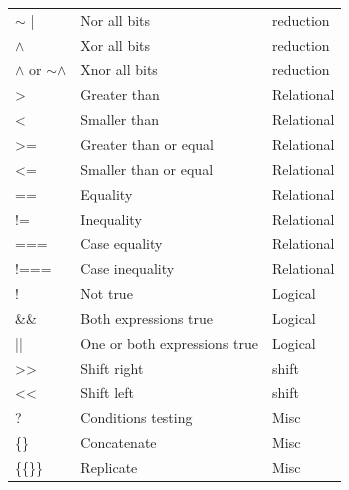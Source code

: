 \begin{table}[H]
\begin{center}
\begin{tabular}{@{}lll@{}}
$\sim$ |                           & Nor all bits                   & reduction    \\
$\wedge$                           & Xor all bits                   & reduction    \\
$\wedge$  or $\sim$$\wedge$        & Xnor all bits                  & reduction    \\
>	                               & Greater than                   & Relational   \\
<	                               & Smaller than                   & Relational   \\
>=	                               & Greater than or equal          & Relational   \\
<=	                               & Smaller than or equal          & Relational   \\
==	                               & Equality                       & Relational   \\
!=	                               & Inequality                     & Relational   \\
===	                               & Case equality                  & Relational   \\
!===	                           & Case inequality                & Relational   \\
!                                  & Not true                       & Logical      \\
\&\&                               & Both expressions true          & Logical      \\
||                                 & One or both expressions true   & Logical      \\
>>                                 & Shift right                    & shift        \\
<<                                 & Shift left                     & shift        \\
?                                  & Conditions testing             & Misc         \\
\{\}                               & Concatenate                    & Misc         \\
\{\{\}\}                           & Replicate                      & Misc         \\ \bottomrule
\end{tabular}
\end{center}
\end{table}
\clearpage


